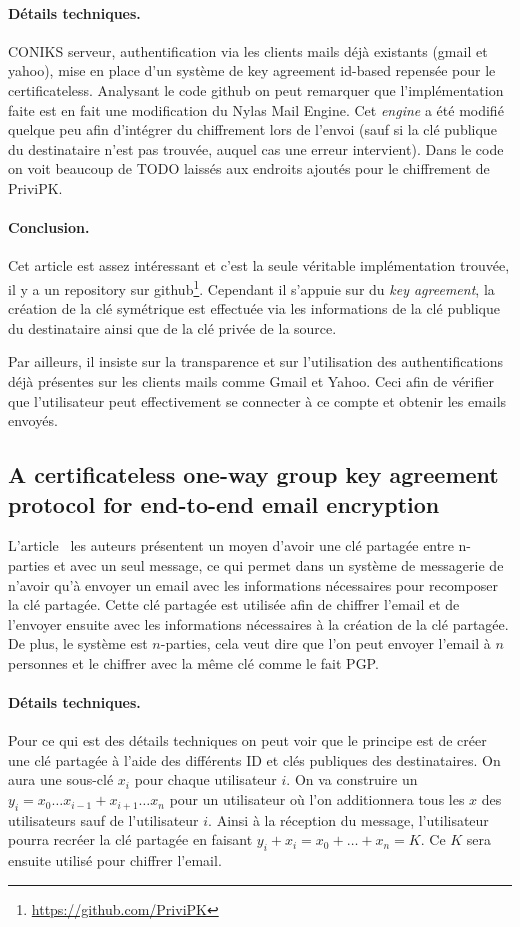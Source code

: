 \paragraph*{Détails techniques.} CONIKS serveur, authentification via les clients mails déjà existants (gmail et yahoo), mise en place d'un système de key agreement id-based repensée pour le certificateless. Analysant le code github on peut remarquer que l'implémentation faite est en fait une modification du Nylas Mail Engine. Cet \textit{engine} a été modifié quelque peu afin d'intégrer du chiffrement lors de l'envoi (sauf si la clé publique du destinataire n'est pas trouvée, auquel cas une erreur intervient). Dans le code on voit beaucoup de TODO laissés aux endroits ajoutés pour le chiffrement de PriviPK. 

\paragraph*{Conclusion.} Cet article est assez intéressant et c'est la seule véritable implémentation trouvée, il y a un repository sur github\footnote{\url{https://github.com/PriviPK}}. Cependant il s'appuie sur du \textit{key agreement}, la création de la clé symétrique est effectuée via les informations de la clé publique du destinataire ainsi que de la clé privée de la source.

Par ailleurs, il insiste sur la transparence et sur l'utilisation des authentifications déjà présentes sur les clients mails comme Gmail et Yahoo. Ceci afin de vérifier que l'utilisateur peut effectivement se connecter à ce compte et obtenir les emails envoyés.

\subsection{A certificateless one-way group key agreement protocol for end-to-end email encryption}
L'article~\cite{conf/prdc/YehSDSSW18} les auteurs présentent un moyen d'avoir une clé partagée entre n-parties et avec un seul message, ce qui permet dans un système de messagerie de n'avoir qu'à envoyer un email avec les informations nécessaires pour recomposer la clé partagée. Cette clé partagée est utilisée afin de chiffrer l'email et de l'envoyer ensuite avec les informations nécessaires à la création de la clé partagée. De plus, le système est $n$-parties, cela veut dire que l'on peut envoyer l'email à $n$ personnes et le chiffrer avec la même clé comme le fait PGP.

\paragraph*{Détails techniques.} Pour ce qui est des détails techniques on peut voir que le principe est de créer une clé partagée à l'aide des différents ID et clés publiques des destinataires. On aura une sous-clé $x_i$ pour chaque utilisateur $i$. On va construire un $y_i = x_0 \dots x_{i-1} + x_{i+1} \dots x_n$ pour un utilisateur où l'on additionnera tous les $x$ des utilisateurs sauf de l'utilisateur $i$. Ainsi à la réception du message, l'utilisateur pourra recréer la clé partagée en faisant $y_i + x_i = x_0 + \dots + x_n = K$. Ce $K$ sera ensuite utilisé pour chiffrer l'email.

